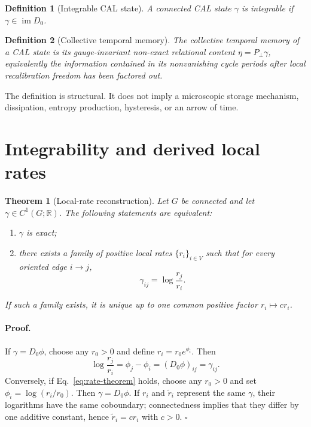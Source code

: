 \documentclass[aip,jmp,amsmath,amssymb,reprint]{revtex4-2}
\newtheorem{definition}{Definition}
\newtheorem{theorem}{Theorem}
\newcommand{\imop}{\operatorname{im}}
\begin{document}
\begin{definition}[Integrable CAL state]
A connected CAL state $\gamma$ is \emph{integrable} if $\gamma\in\imop D_0$.
\end{definition}

\begin{definition}[Collective temporal memory]
The \emph{collective temporal memory} of a CAL state is its gauge-invariant non-exact relational content $\eta=P_\perp\gamma$, equivalently the information contained in its nonvanishing cycle periods after local recalibration freedom has been factored out.
\end{definition}

The definition is structural. It does not imply a microscopic storage mechanism, dissipation, entropy production, hysteresis, or an arrow of time.

\section{Integrability and derived local rates}\label{sec:integrability}

\begin{theorem}[Local-rate reconstruction]\label{thm:rate-reconstruction}
Let $G$ be connected and let $\gamma\in C^1(G;\mathbb R)$. The following statements are equivalent:
\begin{enumerate}
\item $\gamma$ is exact;
\item there exists a family of positive local rates $\{r_i\}_{i\in V}$ such that for every oriented edge $i\to j$,
\begin{equation}
\gamma_{ij}=\log\frac{r_j}{r_i}.
\label{eq:rate-theorem}
\end{equation}
\end{enumerate}
If such a family exists, it is unique up to one common positive factor $r_i\mapsto c r_i$.
\end{theorem}

\paragraph*{Proof.}
If $\gamma=D_0\phi$, choose any $r_0>0$ and define $r_i=r_0e^{\phi_i}$. Then
\begin{equation}
\log\frac{r_j}{r_i}=\phi_j-\phi_i=(D_0\phi)_{ij}=\gamma_{ij}.
\end{equation}
Conversely, if Eq.~\eqref{eq:rate-theorem} holds, choose any $r_0>0$ and set $\phi_i=\log(r_i/r_0)$. Then $\gamma=D_0\phi$. If $r_i$ and $\widetilde r_i$ represent the same $\gamma$, their logarithms have the same coboundary; connectedness implies that they differ by one additive constant, hence $\widetilde r_i=c r_i$ with $c>0$. \hfill$\square$
\end{document}
